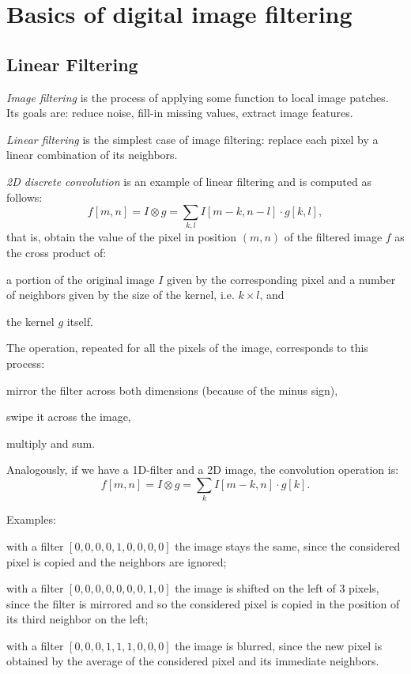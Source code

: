 \section{Basics of digital image filtering}\label{sec:basic-img-filtering}

\subsection{Linear Filtering}\label{sec:bif-linear}

\textit{Image filtering} is the process of applying some function to local image patches. Its goals are: reduce noise, fill-in missing values, extract image features.

\textit{Linear filtering} is the simplest case of image filtering: replace each pixel by a linear combination of its neighbors.

\textit{2D discrete convolution} is an example of linear filtering and is computed as follows:
\begin{equation}\label{eq:conv2d}
    f[m,n] = I \otimes g = \sum_{k,l} I[m-k, n-l] \cdot g[k,l],
\end{equation}
that is, obtain the value of the pixel in position $(m,n)$ of the filtered image $f$ as the cross product of:
\begin{myitem}
    \item a portion of the original image $I$ given by the corresponding pixel and a number of neighbors given by the size of the kernel, i.e. $k \times l$, and
    \item the kernel $g$ itself.
\end{myitem}
The operation, repeated for all the pixels of the image, corresponds to this process:
\begin{myitem}
    \item mirror the filter across both dimensions (because of the minus sign),
    \item swipe it across the image,
    \item multiply and sum.
\end{myitem}

Analogously, if we have a 1D-filter and a 2D image, the convolution operation is:
\begin{equation}\label{eq:conv1d}
    f[m,n] = I \otimes g = \sum_{k} I[m-k, n] \cdot g[k].
\end{equation}

Examples:
\begin{myitem}
    \item with a filter $[0,0,0,0,1,0,0,0,0]$ the image stays the same, since the considered pixel is copied and the neighbors are ignored;
    \item with a filter $[0,0,0,0,0,0,0,1,0]$ the image is shifted on the left of 3 pixels, since the filter is mirrored and so the considered pixel is copied in the position of its third neighbor on the left;
    \item with a filter $[0,0,0,1,1,1,0,0,0]$ the image is blurred, since the new pixel is obtained by the average of the considered pixel and its immediate neighbors.
\end{myitem}

